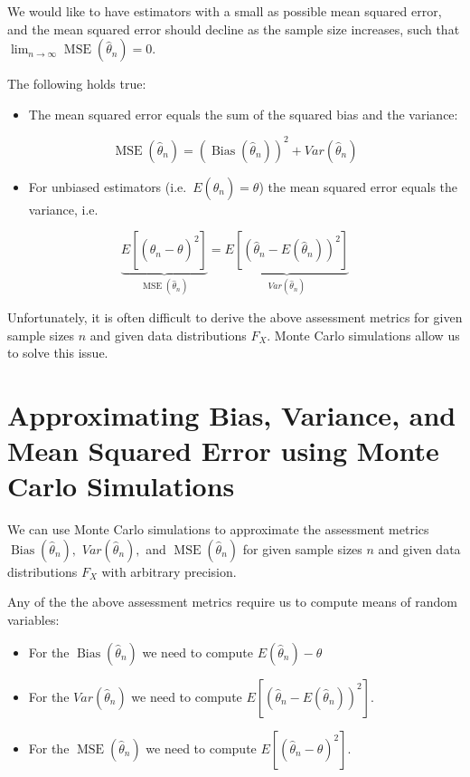 \documentclass[
  letterpaper,
  DIV=11,
  numbers=noendperiod]{scrreprt}
\providecommand{\tightlist}{%
  \setlength{\itemsep}{0pt}\setlength{\parskip}{0pt}}\usepackage{longtable,booktabs,array}
\theoremstyle{definition}
\theoremstyle{plain}
\theoremstyle{plain}
\theoremstyle{remark}
\begin{document}
We would like to have estimators with a small as possible mean squared
error, and the mean squared error should decline as the sample size
increases, such that
\(\lim_{n\to\infty}\operatorname{MSE}\left(\hat\theta_n\right)=0\).

The following holds true:

\begin{itemize}
\tightlist
\item
  The mean squared error equals the sum of the squared bias and the
  variance:
\end{itemize}

\[
\operatorname{MSE}\left(\hat\theta_n\right) = \left(\operatorname{Bias}\left(\hat\theta_n\right)\right)^2 +  Var\left(\hat\theta_n\right) 
\]

\begin{itemize}
\tightlist
\item
  For unbiased estimators (i.e.~\(E(\hat\theta_n)=\theta\)) the mean
  squared error equals the variance, i.e.
\end{itemize}

\[
\underbrace{E\left[\left(\hat\theta_n - \theta\right)^2\right]}_{\operatorname{MSE}\left(\hat\theta_n\right)} = \underbrace{E\left[\left(\hat\theta_n - E\left(\hat\theta_n\right)\right)^2\right]}_{ Var\left(\hat\theta_n\right)} 
\]

Unfortunately, it is often difficult to derive the above assessment
metrics for given sample sizes \(n\) and given data distributions
\(F_X\). Monte Carlo simulations allow us to solve this issue.

\hypertarget{approximating-bias-variance-and-mean-squared-error-using-monte-carlo-simulations}{%
\section{Approximating Bias, Variance, and Mean Squared Error using
Monte Carlo
Simulations}\label{approximating-bias-variance-and-mean-squared-error-using-monte-carlo-simulations}}

We can use Monte Carlo simulations to approximate the assessment metrics
\(\operatorname{Bias}\left(\hat\theta_n\right),\)
\(Var\left(\hat\theta_n\right),\) and
\(\operatorname{MSE}\left(\hat\theta_n\right)\) for given sample sizes
\(n\) and given data distributions \(F_X\) with arbitrary precision.

Any of the the above assessment metrics require us to compute means of
random variables:

\begin{itemize}
\item
  For the \(\operatorname{Bias}\left(\hat\theta_n\right)\) we need to
  compute \(E\left(\hat\theta_n\right)-\theta\)
\item
  For the \(Var\left(\hat\theta_n\right)\) we need to compute
  \(E\left[\left(\hat\theta_n - E(\hat\theta_n)\right)^2\right]\).
\item
  For the \(\operatorname{MSE}\left(\hat\theta_n\right)\) we need to
  compute \(E\left[\left(\hat\theta_n - \theta\right)^2\right]\).
\end{itemize}
\end{document}
